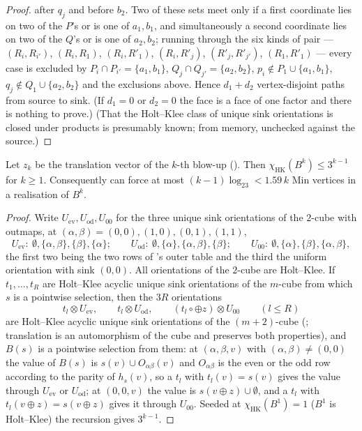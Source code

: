 \begin{proof}
after $q_j$ and before $b_2$.  Two of these sets meet only if a first
coordinate lies on two of the $P$'s or is one of $a_1,b_1$, and simultaneously
a second coordinate lies on two of the $Q$'s or is one of $a_2,b_2$; running
through the six kinds of pair --- $(R_i,R_{i'})$, $(R_i,R_1)$, $(R_i,R'_1)$,
$(R_i,R'_j)$, $(R'_j,R'_{j'})$, $(R_1,R'_1)$ --- every case is excluded by
$P_i\cap P_{i'}=\{a_1,b_1\}$, $Q_j\cap Q_{j'}=\{a_2,b_2\}$, $p_i\notin
P_1\cup\{a_1,b_1\}$, $q_j\notin Q_1\cup\{a_2,b_2\}$ and the exclusions
above.  Hence $d_1+d_2$ vertex-disjoint paths from source to sink.  (If
$d_1=0$ or $d_2=0$ the face is a face of one factor and there is nothing to
prove.)  (That the Holt--Klee class of unique sink
orientations is closed under products is presumably known; from memory,
unchecked against the source.)
\end{proof}

\begin{proposition}
\label{lvl:tower-cover}
Let $z_k$ be the translation vector of the $k$-th blow-up
().  Then $\chi_{\mathrm{HK}}(B^{k})\le3^{k-1}$ for
$k\ge1$.  Consequently  can force at most
$(k-1)\log_23<1.59\,k$ Min vertices in a realisation of $B^{k}$.
\end{proposition}

\begin{proof}
Write $U_{\mathrm{ev}},U_{\mathrm{od}},U_{00}$ for the three unique sink
orientations of the $2$-cube with outmaps, at
$(\alpha,\beta)=(0,0),(1,0),(0,1),(1,1)$,
\[
 U_{\mathrm{ev}}:\ \emptyset,\{\alpha,\beta\},\{\beta\},\{\alpha\};\qquad
 U_{\mathrm{od}}:\ \emptyset,\{\alpha\},\{\alpha,\beta\},\{\beta\};\qquad
 U_{00}:\ \emptyset,\{\alpha\},\{\beta\},\{\alpha,\beta\},
\]
the first two being the two rows of 's outer table and the
third the uniform orientation with sink $(0,0)$.  All orientations of the
$2$-cube are Holt--Klee.  If $t_1,\dots,t_R$ are Holt--Klee acyclic unique sink
orientations of the $m$-cube from which $s$ is a pointwise selection, then the
$3R$ orientations
\[
 t_l\otimes U_{\mathrm{ev}},\qquad t_l\otimes U_{\mathrm{od}},\qquad
 (t_l\circ{\oplus z})\otimes U_{00}\qquad(l\le R)
\]
are Holt--Klee acyclic unique sink orientations of the $(m+2)$-cube
(; translation is an automorphism of the cube and
preserves both properties), and $B(s)$ is a pointwise selection from them: at
$(\alpha,\beta,v)$ with $(\alpha,\beta)\ne(0,0)$ the value of $B(s)$ is
$s(v)\cup O_{\alpha\beta}(v)$ and $O_{\alpha\beta}$ is the even or the odd row
according to the parity of $h_s(v)$, so a $t_l$ with $t_l(v)=s(v)$ gives the
value through $U_{\mathrm{ev}}$ or $U_{\mathrm{od}}$; at $(0,0,v)$ the value is
$s(v\oplus z)\cup\emptyset$, and a $t_l$ with $t_l(v\oplus z)=s(v\oplus z)$
gives it through $U_{00}$.  Seeded at $\chi_{\mathrm{HK}}(B^{1})=1$ ($B^{1}$ is
Holt--Klee) the recursion gives $3^{k-1}$.
\end{proof}

